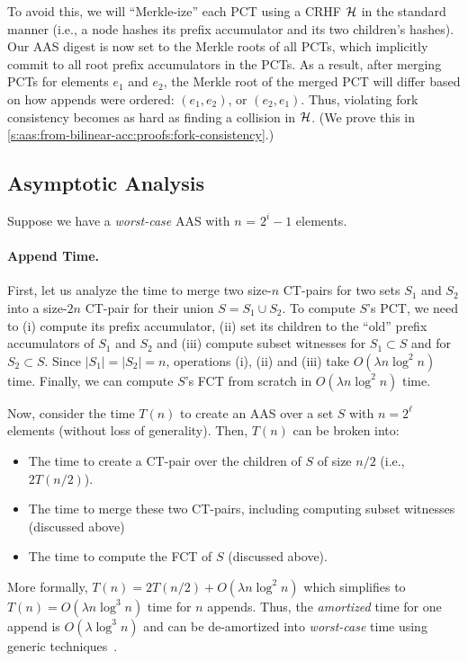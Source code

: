 To avoid this, we will ``Merkle-ize'' each PCT using a CRHF $\mathcal{H}$ in the standard manner (i.e., a node hashes its prefix accumulator and its two children's hashes).
Our AAS digest is now set to the Merkle roots of all PCTs, which implicitly commit to all root prefix accumulators in the PCTs.
As a result, after merging PCTs for elements $e_1$ and $e_2$, the Merkle root of the merged PCT will differ based on how appends were ordered: $(e_1,e_2)$, or $(e_2,e_1)$.
Thus, violating fork consistency becomes as hard as finding a collision in $\mathcal{H}$.
(We prove this in \cref{s:aas:from-bilinear-acc:proofs:fork-consistency}.)

\subsection{Asymptotic Analysis}
\label{s:aas:from-bilinear-acc:asymptotics}

Suppose we have a \textit{worst-case} AAS with $n$ = $2^i - 1$ elements.

\paragraph{Append Time.}
First, let us analyze the time to merge two size-$n$ CT-pairs for two sets $S_1$ and $S_2$ into a size-$2n$ CT-pair for their union $S=S_1 \cup S_2$.
To compute $S$'s PCT, we need to (i) compute its prefix accumulator, (ii) set its children to the ``old'' prefix accumulators of $S_1$ and $S_2$ and (iii) compute subset witnesses for $S_1 \subset S$ and for $S_2\subset S$.
Since $|S_1|=|S_2|=n$, operations (i), (ii) and (iii) take $O(\lambda n \log^2{n})$ time.
Finally, we can compute $S$'s FCT from scratch in $O(\lambda n\log^2 n)$ time.

Now, consider the time $T(n)$ to create an AAS over a set $S$ with $n = 2^\ell$ elements (without loss of generality).
Then, $T(n)$ can be broken into:
\begin{itemize}
    \item The time to create a CT-pair over the children of $S$ of size $n/2$ (i.e., $2T(n/2)$).
    \item The time to merge these two CT-pairs, including computing subset witnesses (discussed above)
    \item The time to compute the FCT of $S$ (discussed above).
\end{itemize}
More formally, $T(n) = 2T(n/2) + O(\lambda n\log^2{n})$ which simplifies to $T(n) = O(\lambda n\log^3{n})$ time for $n$ appends.
Thus, the \textit{amortized} time for one append is $O(\lambda \log^3 {n})$ and can be de-amortized into \textit{worst-case} time using generic techniques~\cite{overmars,overmars-van-leeuwen}.


